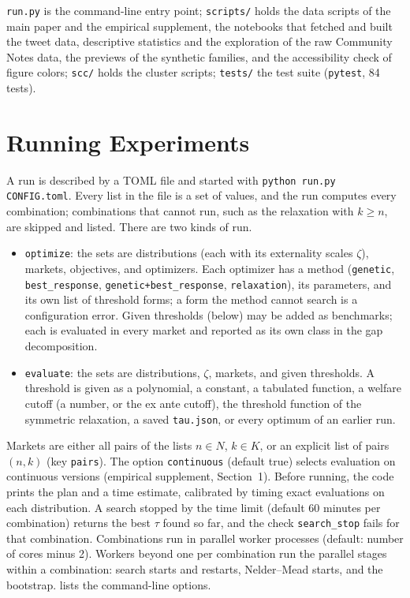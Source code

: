 \documentclass[11pt]{article}
\newcommand{\code}[1]{\texttt{#1}}
\begin{document}
\code{run.py} is the command-line entry point; \code{scripts/} holds the data scripts of the main paper and the empirical supplement, the notebooks that fetched and built the tweet data, descriptive statistics and the exploration of the raw Community Notes data, the previews of the synthetic families, and the accessibility check of figure colors; \code{scc/} holds the cluster scripts; \code{tests/} the test suite (\code{pytest}, 84 tests).

\section{Running Experiments}\label{sec:running}

A run is described by a TOML file and started with \code{python run.py CONFIG.toml}. Every list in the file is a set of values, and the run computes every combination; combinations that cannot run, such as the relaxation with $k\geq n$, are skipped and listed. There are two kinds of run.
\begin{itemize}
    \item \code{optimize}: the sets are distributions (each with its externality scales $\zeta$), markets, objectives, and optimizers. Each optimizer has a method (\code{genetic}, \code{best\_response}, \code{genetic+best\_response}, \code{relaxation}), its parameters, and its own list of threshold forms; a form the method cannot search is a configuration error. Given thresholds (below) may be added as benchmarks; each is evaluated in every market and reported as its own class in the gap decomposition.
    \item \code{evaluate}: the sets are distributions, $\zeta$, markets, and given thresholds. A threshold is given as a polynomial, a constant, a tabulated function, a welfare cutoff (a number, or the ex ante cutoff), the threshold function of the symmetric relaxation, a saved \code{tau.json}, or every optimum of an earlier run.
\end{itemize}
Markets are either all pairs of the lists $n\in N$, $k\in K$, or an explicit list of pairs $(n,k)$ (key \code{pairs}).
The option \code{continuous} (default true) selects evaluation on continuous versions (empirical supplement, Section~1). Before running, the code prints the plan and a time estimate, calibrated by timing exact evaluations on each distribution. A search stopped by the time limit (default 60 minutes per combination) returns the best $\tau$ found so far, and the check \code{search\_stop} fails for that combination. Combinations run in parallel worker processes (default: number of cores minus 2). Workers beyond one per combination run the parallel stages within a combination: search starts and restarts, Nelder--Mead starts, and the bootstrap.  lists the command-line options.
\end{document}
